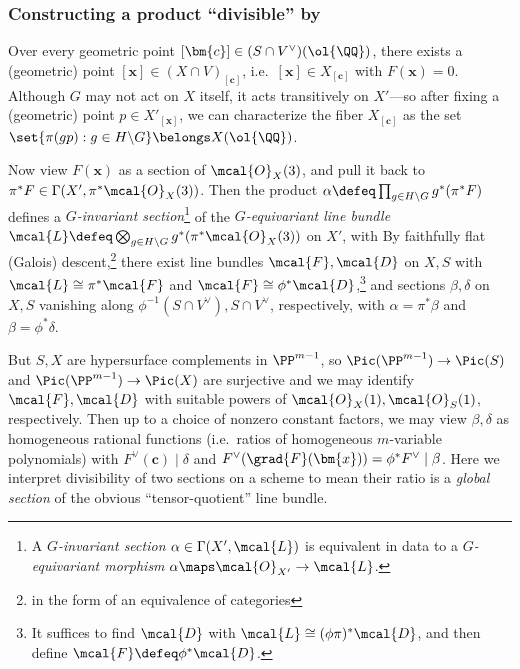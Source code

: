 \documentclass[12pt]{report}
\begin{document}
\subsubsection{Constructing a product ``divisible'' by }
Over every geometric point $[\bm{c}]\in (S\cap V^\vee)(\ol{\QQ})$,
there exists a (geometric) point $[\bm{x}]\in (X\cap V)_{[\bm{c}]}$,
i.e.~$[\bm{x}]\in X_{[\bm{c}]}$ with $F(\bm{x})=0$.
Although $G$ may not act on $X$ itself,
it acts transitively on $X'$---so
after fixing a (geometric) point $p\in X'_{[\bm{x}]}$,
we can characterize the fiber $X_{[\bm{c}]}$ as the set $\set{\pi(gp):g\in H\backslash G}\belongs X(\ol{\QQ})$.

Now view $F(\bm{x})$ as a section of $\mcal{O}_X(3)$,
and pull it back to $\pi^\ast{F}\in\Gamma(X',\pi^\ast\mcal{O}_X(3))$.
Then the product $\alpha\defeq\prod_{g\in H\backslash G}g^\ast(\pi^\ast{F})$ defines a \emph{$G$-invariant section}\footnote{A \emph{$G$-invariant section} $\alpha\in\Gamma(X',\mcal{L})$ is equivalent in data to a \emph{$G$-equivariant morphism} $\alpha\maps\mcal{O}_{X'}\to\mcal{L}$.}
of the \emph{$G$-equivariant line bundle} $\mcal{L}\defeq\bigotimes_{g\in H\backslash G}g^\ast(\pi^\ast\mcal{O}_X(3))$ on $X'$,
with
By faithfully flat (Galois) descent,\footnote{in the form of an equivalence of categories}
there exist line bundles $\mcal{F},\mcal{D}$ on $X,S$ with $\mcal{L}\cong\pi^\ast\mcal{F}$ and $\mcal{F}\cong\phi^\ast\mcal{D}$,\footnote{It suffices to find $\mcal{D}$ with $\mcal{L}\cong(\phi\pi)^\ast\mcal{D}$,
and then define $\mcal{F}\defeq\phi^\ast\mcal{D}$.}
and sections $\beta,\delta$ on $X,S$ vanishing along $\phi^{-1}(S\cap V^\vee),S\cap V^\vee$, respectively,
with $\alpha=\pi^\ast\beta$ and $\beta=\phi^\ast\delta$.

But $S,X$ are hypersurface complements in $\PP^{m-1}$,
so $\Pic(\PP^{m-1})\to\Pic(S)$ and $\Pic(\PP^{m-1})\to\Pic(X)$ are surjective
and we may identify $\mcal{F},\mcal{D}$ with suitable powers of $\mcal{O}_X(1),\mcal{O}_S(1)$, respectively.
Then up to a choice of nonzero constant factors,
we may view $\beta,\delta$ as homogeneous rational functions
(i.e.~ratios of homogeneous $m$-variable polynomials)
with $F^\vee(\bm{c})\mid\delta$ and $F^\vee(\grad{F}(\bm{x}))=\phi^\ast{F^\vee}\mid\beta$.
Here we interpret divisibility of two sections on a scheme to mean their ratio is a \emph{global section} of the obvious ``tensor-quotient'' line bundle.
\end{document}
